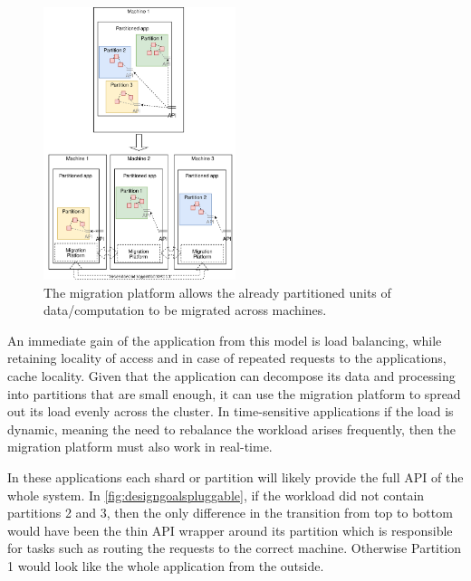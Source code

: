 \begin{figure}[t]
\centering

\includegraphics[width=0.5\textwidth]{design-goals-pluggable.drawio}
\caption{
    The migration platform allows the already partitioned units of
    data/computation to be migrated across machines. 
}
\label{fig:designgoalspluggable}
\end{figure}

An immediate gain of the application from this model is load balancing,
while retaining locality of access and in case of repeated requests to
the applications, cache locality.
Given that the application can decompose its data and processing into
partitions that are small enough, it can use the migration platform to
spread
out its load evenly across the cluster. In time-sensitive applications
if the load is dynamic,
meaning the need to rebalance the workload arises frequently,
then the migration platform must also work in real-time.

In these applications each shard or partition will likely provide the
full API of the whole system. In \autoref{fig:designgoalspluggable},
if the workload did not contain partitions 2 and 3, then the only
    difference in the transition from top to bottom would have been the
    thin API wrapper around its partition which is responsible for tasks
    such as routing the requests to the correct machine. Otherwise
    Partition 1 would look like the whole application from the outside.

